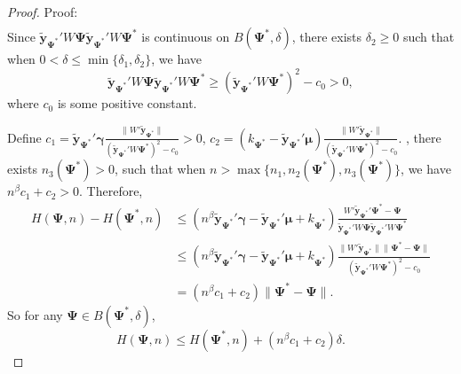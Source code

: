\documentclass[final,11pt,3p]{article}\usepackage{setspace}
\begin{document}
\begin{proof}{Proof:}
\begin{align*}
\end{align*}
Since $ \tilde{\boldsymbol{y}}_{\boldsymbol{\Psi}^*}' W \boldsymbol{\Psi}  \tilde{\boldsymbol{y}}_{\boldsymbol{\Psi}^*}' W\boldsymbol{\Psi}^*$ is continuous on $B(\boldsymbol{\Psi}^*, \delta)$, there exists $\delta_2 \ge 0$ such that when $0 < \delta \le \min\{\delta_1, \delta_2\}$, we have
\begin{equation*}
 \tilde{\boldsymbol{y}}_{\boldsymbol{\Psi}^*}' W \boldsymbol{\Psi} \tilde{\boldsymbol{y}}_{\boldsymbol{\Psi}^*}' W\boldsymbol{\Psi}^*
\ge  (\tilde{\boldsymbol{y}}_{\boldsymbol{\Psi}^*}' W \boldsymbol{\Psi}^*)^2 - c_0 > 0,
\end{equation*}
where $c_0$ is some positive constant.

Define $c_1 =  \tilde{\boldsymbol{y}}_{\boldsymbol{\Psi}^*}'\boldsymbol{\gamma}  \frac{\|W'\tilde{\boldsymbol{y}}_{\boldsymbol{\Psi}^*}\|}{( \tilde{\boldsymbol{y}}_{\boldsymbol{\Psi}^*}' W \boldsymbol{\Psi}^*)^2 - c_0} > 0$, $c_2 = (k_{\boldsymbol{\Psi}^*} - \tilde{\boldsymbol{y}}_{\boldsymbol{\Psi}^*}'\boldsymbol{\mu} ) \frac{\|W'\tilde{\boldsymbol{y}}_{\boldsymbol{\Psi}^*}\|}{( \tilde{\boldsymbol{y}}_{\boldsymbol{\Psi}^*}' W \boldsymbol{\Psi}^*)^2 - c_0}$. {{}}, there exists $n_3(\boldsymbol{\Psi}^*) > 0$, such that when $n > \max \{n_1, n_2(\boldsymbol{\Psi}^*), n_3(\boldsymbol{\Psi}^*)\}$, we have $n^{\beta}c_1 + c_2 > 0$.
Therefore,
\begin{align*}
H(\boldsymbol{\Psi},n)- H(\boldsymbol{\Psi}^*,n)
 & \le (n^{\beta} \tilde{\boldsymbol{y}}_{\boldsymbol{\Psi}^*}'\boldsymbol{\gamma} - \tilde{\boldsymbol{y}}_{\boldsymbol{\Psi}^*}'\boldsymbol{\mu}  + k_{\boldsymbol{\Psi}^*})\frac{ W'\tilde{\boldsymbol{y}}_{\boldsymbol{\Psi}^*}' \boldsymbol{\Psi}^*- \boldsymbol{\Psi} }{ \tilde{\boldsymbol{y}}_{\boldsymbol{\Psi}^*}' W \boldsymbol{\Psi}  \tilde{\boldsymbol{y}}_{\boldsymbol{\Psi}^*}' W\boldsymbol{\Psi}^*}\\
 & \le  (n^{\beta} \tilde{\boldsymbol{y}}_{\boldsymbol{\Psi}^*}'\boldsymbol{\gamma} -  \tilde{\boldsymbol{y}}_{\boldsymbol{\Psi}^*}'\boldsymbol{\mu}  + k_{\boldsymbol{\Psi}^*})\frac{\|W'\tilde{\boldsymbol{y}}_{\boldsymbol{\Psi}^*}\| \|\boldsymbol{\Psi}^*- \boldsymbol{\Psi} \|}{  (\tilde{\boldsymbol{y}}_{\boldsymbol{\Psi}^*}' W \boldsymbol{\Psi}^*)^2 - c_0}\\
& = (n^{\beta}c_1 + c_2)\|\boldsymbol{\Psi}^*- \boldsymbol{\Psi} \|.
\end{align*}
So for any $\boldsymbol{\Psi} \in B(\boldsymbol{\Psi}^*, \delta)$,
\begin{equation}\label{P_bound}
H(\boldsymbol{\Psi}, n) \le H(\boldsymbol{\Psi}^*, n) + (n^{\beta}c_1 + c_2) \delta.
\end{equation}


\end{proof}
\end{document}
